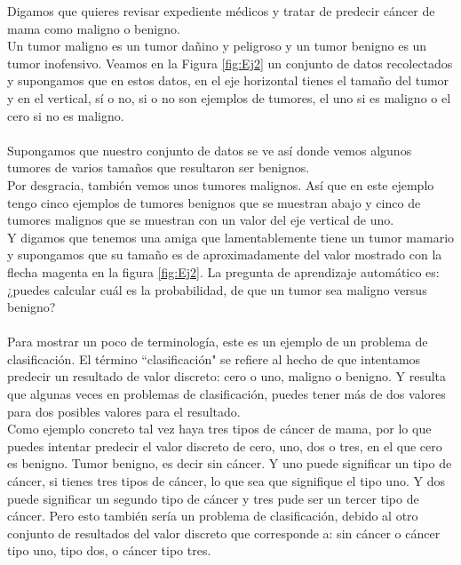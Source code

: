 \documentclass{report}
\begin{document}
Digamos que quieres revisar
expediente médicos y tratar de predecir cáncer de mama como maligno o benigno. \\Un tumor maligno es un
tumor dañino y peligroso y un tumor benigno es un tumor inofensivo.
Veamos  en la Figura \ref{fig:Ej2} un conjunto de datos recolectados y supongamos
que en estos datos, en el eje horizontal tienes el tamaño del tumor y
en el vertical, sí o no, si o no son
ejemplos de tumores, el uno si es maligno o el cero si no es maligno.\\\\ Supongamos que nuestro conjunto de datos se ve así donde vemos algunos tumores de varios 
tamaños que resultaron ser benignos.\\
Por desgracia, también vemos unos tumores malignos. Así que en este ejemplo tengo cinco ejemplos de tumores
benignos que se muestran abajo y cinco de tumores malignos que se muestran con un
valor del eje vertical de uno.\\ Y digamos que tenemos una amiga que lamentablemente tiene un
tumor mamario y supongamos que su tamaño es de aproximadamente del valor mostrado con la flecha magenta en la figura \ref{fig:Ej2}. La
pregunta de aprendizaje automático es: ¿puedes calcular cuál es la probabilidad,
de que un tumor sea maligno versus benigno?\\\\ Para mostrar un poco
de terminología, este es un ejemplo de un problema de clasificación. El término
``clasificación" se refiere al hecho de que intentamos predecir un resultado
de valor discreto: cero o uno, maligno o benigno. Y resulta que algunas veces
en problemas de clasificación, puedes tener más de dos valores para dos
posibles valores para el resultado.\\ Como ejemplo concreto tal vez haya tres
tipos de cáncer de mama, por lo que puedes intentar predecir el valor discreto de cero,
uno, dos o tres, en el que cero es benigno. Tumor benigno, es decir sin cáncer. Y uno puede
significar un tipo de cáncer, si tienes tres tipos de cáncer, lo que sea que signifique
el tipo uno. Y dos puede significar un segundo tipo de cáncer y tres pude ser un tercer tipo de
cáncer. Pero esto también sería un problema de clasificación, debido al otro
conjunto de resultados del valor discreto que corresponde a: sin cáncer o cáncer tipo
uno, tipo dos, o cáncer tipo tres.\\\\
\end{document}
